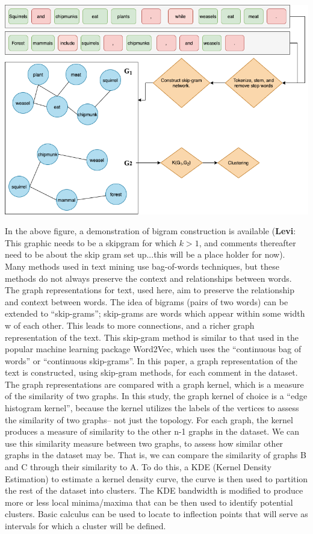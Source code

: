  \includegraphics[width=6in]{Content/Images/proposal_diagram.png}\\\vspace*{25mm}
 
 In the above figure, a demonstration of bigram construction is available (\textbf{Levi}: This graphic needs to be a skipgram for which $k > 1$, and comments thereafter need to be about the skip gram set up...this will be a place holder for now).\\

Many methods used in text mining use bag-of-words techniques, but these methods do not always preserve the context and relationships between words. The graph representations for text, used here, aim to preserve the relationship and context between words. The idea of bigrams (pairs of two words) can be extended to “skip-grams”; skip-grams are words which appear within some width w of each other. This leads to more connections, and a richer graph representation of the text. This skip-gram method is similar to that used in the popular machine learning package Word2Vec, which uses the “continuous bag of words” or “continuous skip-grams”. In this paper, a graph representation of the text is constructed, using skip-gram methods, for each comment in the dataset. \\

The graph representations are compared with a graph kernel, which is a measure of the similarity of two graphs. In this study, the graph kernel of choice is a “edge histogram kernel”, because the kernel utilizes the labels of the vertices to assess the similarity of two graphs– not just the topology. For each graph, the kernel produces a measure of similarity to the other n-1 graphs in the dataset. We can use this similarity measure between two graphs, to assess how similar other graphs in the dataset may be. That is, we can compare the similarity of graphs B and C through their similarity to A. To do this, a KDE (Kernel Density Estimation) to estimate a kernel density curve, the curve is then used to partition the rest of the dataset into clusters. The KDE bandwidth is modified to produce more or less local minima/maxima that can be then used to identify potential clusters. Basic calculus can be used to locate to inflection points that will serve as intervals for which a cluster will be defined. \\

